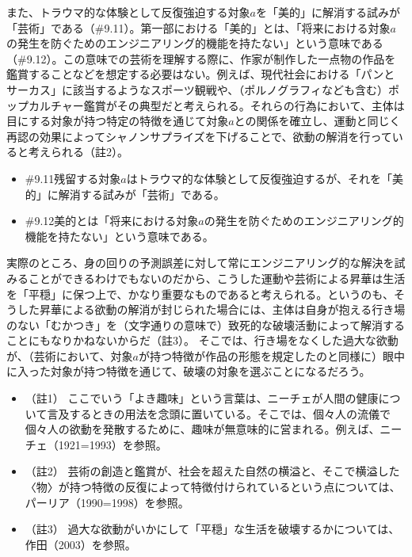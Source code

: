 また、トラウマ的な体験として反復強迫する対象\(a\)を「美的」に解消する試みが「芸術」である（\#9.11）。第一部における「美的」とは、「将来における対象\(a\)の発生を防ぐためのエンジニアリング的機能を持たない」という意味である（\#9.12）。この意味での芸術を理解する際に、作家が制作した一点物の作品を鑑賞することなどを想定する必要はない。例えば、現代社会における「パンとサーカス」に該当するようなスポーツ観戦や、（ポルノグラフィなども含む）ポップカルチャー鑑賞がその典型だと考えられる。それらの行為において、主体は目にする対象が持つ特定の特徴を通じて対象\(a\)との関係を確立し、運動と同じく再認の効果によってシャノンサプライズを下げることで、欲動の解消を行っていると考えられる（註2）。

\begin{note}{}
  \begin{itemize}
    \tightlist
    \item{\#9.11}残留する対象$a$はトラウマ的な体験として反復強迫するが、それを「美的」に解消する試みが「芸術」である。
    \item{\#9.12}美的とは「将来における対象$a$の発生を防ぐためのエンジニアリング的機能を持たない」という意味である。
  \end{itemize}
\end{note}

実際のところ、身の回りの予測誤差に対して常にエンジニアリング的な解決を試みることができるわけでもないのだから、こうした運動や芸術による昇華は生活を「平穏」に保つ上で、かなり重要なものであると考えられる。というのも、そうした昇華による欲動の解消が封じられた場合には、主体は自身が抱える行き場のない「むかつき」を（文字通りの意味で）致死的な破壊活動によって解消することにもなりかねないからだ（註3）。
そこでは、行き場をなくした過大な欲動が、（芸術において、対象\(a\)が持つ特徴が作品の形態を規定したのと同様に）眼中に入った対象が持つ特徴を通じて、破壊の対象を選ぶことになるだろう。

\begin{itemize}
\tightlist
\item
  （註1）
  ここでいう「よき趣味」という言葉は、ニーチェが人間の健康について言及するときの用法を念頭に置いている。そこでは、個々人の流儀で個々人の欲動を発散するために、趣味が無意味的に営まれる。例えば、ニーチェ（1921=1993）\cite{Nietzsche3}を参照。
\item
  （註2）
  芸術の創造と鑑賞が、社会を超えた自然の横溢と、そこで横溢した〈物〉が持つ特徴の反復によって特徴付けられているという点については、パーリア（1990=1998）\cite{Paglia}を参照。
\item
  （註3）
  過大な欲動がいかにして「平穏」な生活を破壊するかについては、作田（2003）\cite{Sakuta}を参照。
\end{itemize}


